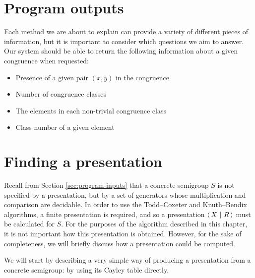 \section{Program outputs}
\label{sec:program-outputs}

Each method we are about to explain can provide a variety of different pieces of
information, but it is important to consider which questions we aim to answer.
Our system should be able to return the following information about a given
congruence when requested:

\begin{itemize}
\item Presence of a given pair $(x,y)$ in the congruence
\item Number of congruence classes
\item The elements in each non-trivial congruence class
\item Class number of a given element
\end{itemize}

\section{Finding a presentation}
\label{sec:find-pres}

Recall from Section \ref{sec:program-inputs} that a concrete semigroup $S$ is
not specified by a presentation, but by a set of generators whose multiplication
and comparison are decidable.  In order to use the Todd--Coxeter and
Knuth--Bendix algorithms, a finite presentation is required, and so a presentation
$\left\langle\,X ~\middle|~ R\,\right\rangle$ must be calculated for $S$.  For the purposes of the algorithm
described in this chapter, it is not important how this presentation is
obtained.  However, for the sake of completeness, we will briefly discuss how a
presentation could be computed.

We will start by describing a very simple way of producing a presentation from a
concrete semigroup: by using its Cayley table directly.

